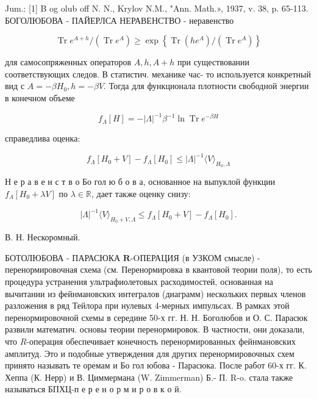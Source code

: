 \documentclass[10pt]{article}
\begin{document}
Jum.: [1] B og olub off N. N., Krylov N.M., "Ann. Math.», 1937, v. 38, p. 65-113. БОГОЛЮБОВА - ПАЙЕРЛСА НЕРАВЕНСТВО - неравенство



\[

\operatorname{Tr} e^{A+h} /\left(\operatorname{Tr} e^{A}\right) \geqslant \exp \left\{\operatorname{Tr}\left(h e^{A}\right) /\left(\operatorname{Tr} e^{A}\right)\right\}

\]



для самосопряженных операторов $A, h, A+h$ при существовании соответствующих следов. В статистич. механике час- то используется конкретный вид с $A=-\beta H_{0}, h=-\beta V$. Тогда для функционала плотности свободной энергии в конечном объеме



\[

f_{\Lambda}[H]=-|\Lambda|^{-1} \beta^{-1} \ln \operatorname{Tr} e^{-\beta H}

\]



справедлива оценка:



\[

f_{\Lambda}\left[H_{0}+V\right]-f_{\Lambda}\left[H_{0}\right] \leqslant|\Lambda|^{-1}\langle V\rangle_{H_{0}, \Lambda}

\]



Н е р а в е н с т в о Бо гол ю б о в а, основанное на выпуклой функции $f_{\Lambda}\left[H_{0}+\lambda V\right]$ по $\lambda \in \mathbb{R}$, дает также оценку снизу:



\[

|\Lambda|^{-1}\langle V\rangle_{H_{0}+V, \Lambda} \leqslant f_{\Lambda}\left[H_{0}+V\right]-f_{\Lambda}\left[H_{0}\right] .

\]



В. Н. Нескоромный.



БОТОЛЮБОВА - ПАРАСЮКА $\boldsymbol{R}$-OПЕРАЦИЯ (в УЗКОМ смысле) - перенормировочная схема (см. Перенормировка в квантовой теории поля), то есть процедура устранения ультрафиолетовых расходимостей, основанная на вычитании из фейнмановских интегралов (диаграмм) нескольких первых членов разложения в ряд Тейлора при нулевых 4-мерных импульсах. В рамках этой перенормировочной схемы в середине 50-х гг. Н. Н. Боголюбов и О. С. Парасюк развили математич. основы теории перенормировок. В частности, они доказали, что $R$-операция обеспечивает конечность перенормированных фейнмановских амплитуд. Это и подобные утверждения для других перенормировочных схем принято называть те оремам и Бо гол юбова - Парасюка. После работ 60-х гг. К. Хеппа (К. Нерр) и В. Циммермана (W. Zimmerman) Б.- П. R-o. стала также называться БПХЦ-п е р е н о р м и р о в к о й.
\end{document}

